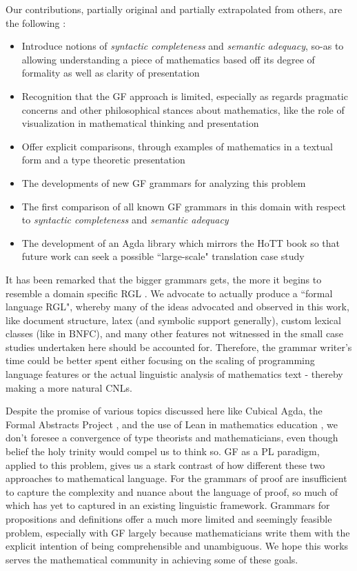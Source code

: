 Our contributions, partially original and partially extrapolated from others,
are the following :

\begin{itemize}
\item Introduce notions of \emph{syntactic completeness} and \emph{semantic adequacy}, so-as to
allowing understanding a piece of mathematics based off its degree of formality
as well as clarity of presentation
\item Recognition that the GF approach is limited, especially as regards pragmatic
concerns and other philosophical stances about mathematics, like the role of
visualization in mathematical thinking and presentation
\item Offer explicit comparisons, through examples of mathematics in a textual form and a type
  theoretic presentation
\item The developments of new GF grammars for analyzing this problem
\item The first comparison of all known GF grammars in this domain with respect
  to \emph{syntactic completeness} and \emph{semantic adequacy}
\item The development of an Agda library which mirrors the HoTT book so that
  future work can seek a possible ``large-scale" translation case study
\end{itemize}


 It has been remarked that the bigger grammars gets, the more it begins to
resemble a domain specific RGL \cite{angelovSS}. We advocate to actually produce
a ``formal language RGL", whereby many of the ideas advocated and observed in
this work, like document structure, latex (and symbolic support generally),
custom lexical classes (like in BNFC), and many other features not witnessed in
the small case studies undertaken here should be accounted for. Therefore, the
grammar writer's time could be better spent either focusing on the scaling of
programming language features or the actual linguistic analysis of
mathematics text - thereby making a more natural CNLs.

Despite the promise of various topics discussed here like Cubical Agda, the
Formal Abstracts Project , and the use of Lean in mathematics education
\cite{buzzard2020will}, we don't foresee a convergence of type theorists and
mathematicians, even though belief the holy trinity would compel us to think so.
GF as a PL paradigm, applied to this problem, gives us a stark contrast of how
different these two approaches to mathematical language. For the grammars of
proof are insufficient to capture the complexity and nuance about the language
of proof, so much of which has yet to captured in an existing linguistic
framework. Grammars for propositions and definitions offer a much more limited
and seemingly feasible problem, especially with GF largely because
mathematicians write them with the explicit intention of being comprehensible
and unambiguous. We hope this works serves the mathematical community in
achieving some of these goals.

